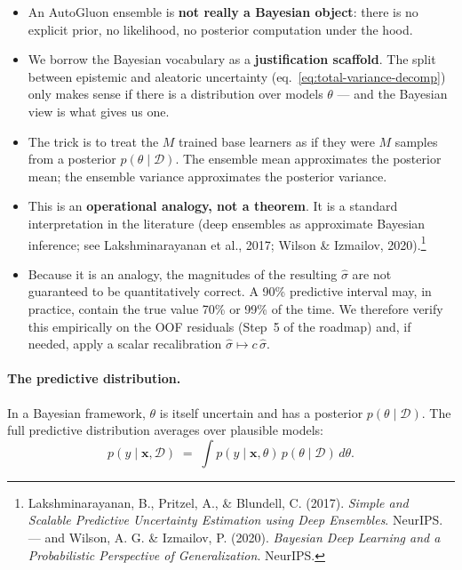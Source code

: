 \documentclass[11pt,a4paper]{article}
\begin{document}
\begin{itemize}
    \item An AutoGluon ensemble is \textbf{not really a Bayesian object}: there is no explicit prior, no likelihood, no posterior computation under the hood.
    \item We borrow the Bayesian vocabulary as a \textbf{justification scaffold}. The split between epistemic and aleatoric uncertainty (eq.~\eqref{eq:total-variance-decomp}) only makes sense if there is a distribution over models $\theta$ --- and the Bayesian view is what gives us one.
    \item The trick is to treat the $M$ trained base learners as if they were $M$ samples from a posterior $p(\theta \mid \mathcal{D})$. The ensemble mean approximates the posterior mean; the ensemble variance approximates the posterior variance.
    \item This is an \textbf{operational analogy, not a theorem}. It is a standard interpretation in the literature (deep ensembles as approximate Bayesian inference; see Lakshminarayanan et al., 2017; Wilson \& Izmailov, 2020).\footnote{Lakshminarayanan, B., Pritzel, A., \& Blundell, C. (2017). \emph{Simple and Scalable Predictive Uncertainty Estimation using Deep Ensembles}. NeurIPS. --- and Wilson, A. G. \& Izmailov, P. (2020). \emph{Bayesian Deep Learning and a Probabilistic Perspective of Generalization}. NeurIPS.}
    \item Because it is an analogy, the magnitudes of the resulting $\hat\sigma$ are not guaranteed to be quantitatively correct. A 90\% predictive interval may, in practice, contain the true value 70\% or 99\% of the time. We therefore verify this empirically on the OOF residuals (Step~5 of the roadmap) and, if needed, apply a scalar recalibration $\hat\sigma \mapsto c\,\hat\sigma$.
\end{itemize}

\paragraph{The predictive distribution.} In a Bayesian framework, $\theta$ is itself uncertain and has a posterior $p(\theta \mid \mathcal{D})$. The full predictive distribution averages over plausible models:
\begin{equation}
p(y \mid \bm x, \mathcal{D}) \;=\; \int p(y \mid \bm x, \theta) \, p(\theta \mid \mathcal{D}) \, d\theta .
\label{eq:posterior-predictive}
\end{equation}
\end{document}
